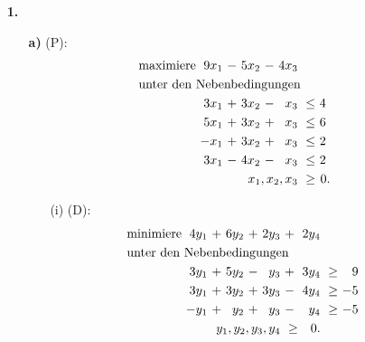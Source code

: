\documentclass [a4paper,11pt]{article}
\author{\authorinfotitle}
\title{\titleinfo}
\date{\today}
\begin{document}
\maketitle
    \begin{enumerate}
        \item[\textbf{1.}]
        \begin{enumerate}
        \item[\textbf{a)}]
            (P):
            \begin{align*}
            \begin{alignedat}{6}
            & \text{maximiere } & 9x_1 &\ - &\ 5x_2 &\ - &\ 4x_3 & & \\
            & \rlap{unter den Nebenbedingungen} & & & & & & & \\
            &&  3x_1 &\ + &\ 3x_2 &\ - &\ x_3 &\ \leq &\ 4\ \\
            &&  5x_1 &\ + &\ 3x_2 &\ + &\ x_3 &\ \leq &\ 6\ \\
            &&  -x_1 &\ + &\ 3x_2 &\ + &\ x_3 &\ \leq &\ 2\ \\
            &&  3x_1 &\ - &\ 4x_2 &\ - &\ x_3 &\ \leq &\ 2\ \\
            && & & & & \llap{$x_1,x_2,x_3$} &\ \geq &\ 0.
            \end{alignedat}
            \end{align*}

            \begin{enumerate}
            \item[(i)]
                (D):
                \begin{align*}
                \begin{alignedat}{6}
                & \text{minimiere } & 4y_1 &\ + &\ 6y_2 &\ + &\ 2y_3 &\ + &\ 2y_4 & & \\
                & \rlap{unter den Nebenbedingungen} & & & & & & & & & \\
                &&  3y_1 &\ + &\ 5y_2 &\ - &\  y_3 &\ + &\ 3y_4 &\ \geq &\  9\ \\
                &&  3y_1 &\ + &\ 3y_2 &\ + &\ 3y_3 &\ - &\ 4y_4 &\ \geq &\ -5\ \\
                &&  -y_1 &\ + &\  y_2 &\ + &\  y_3 &\ - &\  y_4 &\ \geq &\ -5\ \\
                && & & & & \llap{$y_1,y_2,y_3,y_4$} &\ \geq &\ 0.
                \end{alignedat}
                \end{align*}


\end{enumerate}
\end{enumerate}
\end{enumerate}
\end{document}
